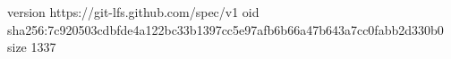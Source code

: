 version https://git-lfs.github.com/spec/v1
oid sha256:7c920503cdbfde4a122bc33b1397cc5e97afb6b66a47b643a7cc0fabb2d330b0
size 1337
